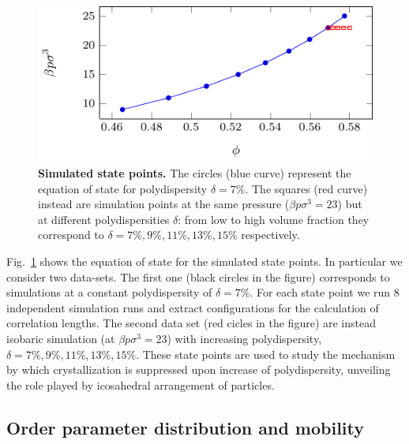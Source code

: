 \documentclass[twocolumn,superscriptaddress]{revtex4-1}
\begin{document}
\begin{figure}
 \centering
 \includegraphics{fig_eos}
 \caption{\textbf{Simulated state points.} The circles (blue curve) represent the equation of state for polydispersity $\delta=7\%$. The squares (red curve) instead are simulation points at the same pressure ($\beta p\sigma^3=23$) but at different polydispersities $\delta$: from low to high volume fraction they correspond to $\delta=7\%,9\%,11\%,13\%,15\%$ respectively.}
 \label{fig:eos}
\end{figure}


Fig.~\ref{fig:eos} shows the equation of state for the simulated state points. In particular
we consider two data-sets. The first one (black circles in the figure) corresponds to
simulations at a constant polydispersity of $\delta=7\%$. For each state point we run $8$ independent
simulation runs and extract configurations for the calculation of correlation lengths.
The second data set (red cicles in the figure) are instead isobaric simulation (at $\beta p\sigma^3=23$)
with increasing polydispersity, $\delta=7\%,9\%,11\%,13\%,15\%$. These state points are used to study
the mechanism by which crystallization is suppressed upon increase of polydispersity, unveiling the
role played by icosahedral arrangement of particles.

\subsection{Order parameter distribution and mobility}\label{sec:order_parameters}
\end{document}
